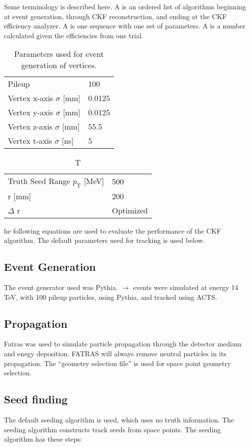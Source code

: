\documentclass{article}
\newcommand{\pt}[0]{p_\textrm{T}}
\newcommand{\figtab}[3]{
\begin{table}[H]
\begin{tabular}{#1}
#2
\end{tabular}
\caption{#3}
\end{table}}
\begin{document}
Some terminology is described here. A  is an ordered list of algorithms beginning at event generation, through CKF reconstruction, and ending at the CKF efficiency analyzer. A  is one sequence with one set of parameters. A  is a number calculated given the efficiencies from one trial.

\figtab{l l}{Pileup & 100\\
Vertex x-axis $\sigma$ [mm] & 0.0125\\
Vertex y-axis $\sigma$ [mm] & 0.0125\\
Vertex z-axis $\sigma$ [mm] & 55.5\\
Vertex t-axis $\sigma$ [ns] & 5}{Parameters used for event generation of vertices.}

\figtab{l l}{Truth Seed Range $\pt$ [MeV] & 500\\
r [mm] & 200\\
$\Delta$ r & Optimized}

The following equations are used to evaluate the performance of the CKF algorithm. The default parameters used for tracking is used below.

\subsection{Event Generation}

The event generator used was Pythia. \qqbar $\rightarrow$ \ttbar events were simulated at energy 14 TeV, with 100 pileup particles, using Pythia, and tracked using ACTS.

\subsection{Propagation}

Fatras was used to simulate particle propagation through the detector medium and enegy deposition. FATRAS will always remove neutral particles in its propagation. The ``geometry selection file'' is used for space point geometry selection.


\subsection{Seed finding}

The default seeding algorithm is used, which uses no truth information. The seeding algorithm constructs track seeds from space points. The seeding algorithm has these steps:
\end{document}
